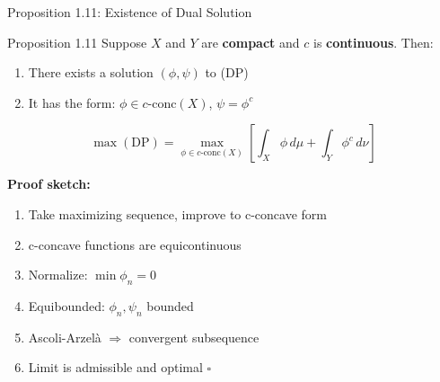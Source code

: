 \documentclass[aspectratio=169]{beamer}
\begin{document}
\begin{frame}{Proposition 1.11: Existence of Dual Solution}
\begin{block}{Proposition 1.11}
Suppose $X$ and $Y$ are \textbf{compact} and $c$ is \textbf{continuous}. Then:
\begin{enumerate}
    \item There exists a solution $(\phi, \psi)$ to (DP)
    \item It has the form: $\phi \in c\text{-conc}(X)$, $\psi = \phi^c$
\end{enumerate}
\vspace{-0.2cm}
\[
\max(\text{DP}) = \max_{\phi \in c\text{-conc}(X)} \left[ \int_X \phi \, d\mu + \int_Y \phi^c \, d\nu \right]
\]
\vspace{-0.3cm}
\end{block}

\textbf{Proof sketch:}
\begin{enumerate}
    \setlength{\itemsep}{0pt}
    \item Take maximizing sequence, improve to c-concave form
    \item c-concave functions are equicontinuous
    \item Normalize: $\min \phi_n = 0$
    \item Equibounded: $\phi_n, \psi_n$ bounded
    \item Ascoli-Arzel\`a $\Rightarrow$ convergent subsequence
    \item Limit is admissible and optimal \hfill $\square$
\end{enumerate}
\end{frame}
\end{document}
